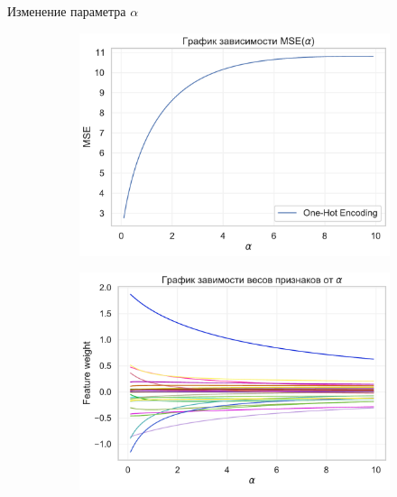 \documentclass{beamer} %
\begin{document}
    \begin{frame}{Изменение параметра $\alpha$}
        \begin{figure}
            \centering
            \begin{subfigure}[b]{0.475\textwidth}
                \centering
                \includegraphics[width=\textwidth]{MSE_plot_oh_1.pdf}
            \end{subfigure}
            \hfill
            \begin{subfigure}[b]{0.475\textwidth}  
                \centering 
                \includegraphics[width=\textwidth]{feature_plot_oh_1.pdf}
            \end{subfigure}
            \begin{subfigure}[b]{0.475\textwidth}   
                \centering 

\end{subfigure}
\end{figure}
\end{frame}
\end{document}
